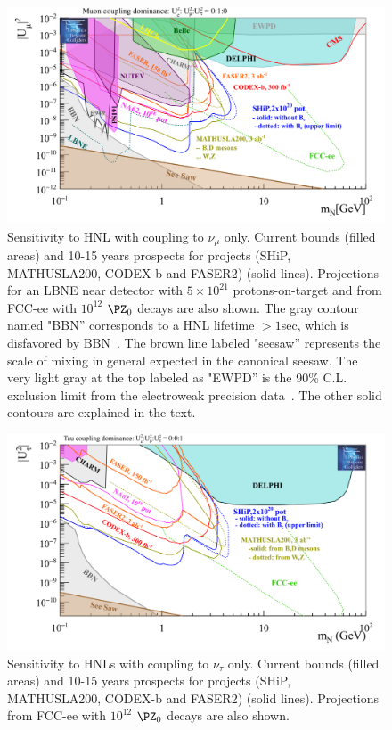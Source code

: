 \begin{figure}[h]
  \centering
  \includegraphics[width=.90\textwidth]{Figures/c3/HNL_bc7_pbc_2.png}
    \caption{Sensitivity to HNL with coupling to $\nu_\mu$ only. Current bounds (filled areas) and 10-15 years prospects for projects
(SHiP, MATHUSLA200, CODEX-b and FASER2) (solid lines). Projections for an LBNE
near detector with $5\times 10^{21}$ protons-on-target and from FCC-ee with $10^{12}$ $\PZ_0$ decays are also shown. The gray contour named "BBN'' corresponds to a HNL lifetime $>1$sec,
which is disfavored by BBN~\cite{Ruchayskiy_2012}. The brown line
labeled "seesaw'' represents the scale of mixing in general expected
in the canonical seesaw. The very light gray at the top
labeled as "EWPD'' is the 90\% C.L. exclusion limit from the
electroweak precision data~\cite{Antusch_2015}. The other solid
contours are explained in the text.}
  \label{fig:HNL_bc7_pbc_2}
\end{figure}

\begin{figure}[h]
  \centering
  \includegraphics[width=.90\textwidth]{Figures/c3/HNL_bc8_pbc_2.png}
    \caption{Sensitivity to HNLs with coupling to $\nu_\tau$ only. Current bounds (filled areas) and 10-15 years prospects for projects
(SHiP, MATHUSLA200, CODEX-b and FASER2) (solid lines). Projections from FCC-ee with $10^{12}$ $\PZ_0$ decays are also shown.}
  \label{fig:HNL_bc8_pbc_2}
\end{figure}

